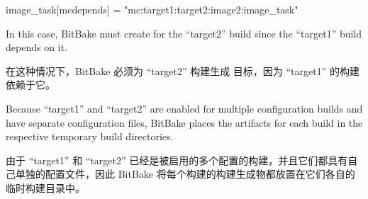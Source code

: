 \begin{pyglist}
image_task[mcdepends] = "mc:target1:target2:image2:image_task"
\end{pyglist}

In this case, BitBake must create  for the ``target2'' build since the ``target1'' build depends on it.

在这种情况下，BitBake 必须为 ``target2'' 构建生成  目标，因为 ``target1'' 的构建依赖于它。

Because ``target1'' and ``target2'' are enabled for multiple configuration builds and have separate configuration files, BitBake places the artifacts for each build in the respective temporary build directories.

由于 ``target1'' 和 ``target2'' 已经是被启用的多个配置的构建，并且它们都具有自己单独的配置文件，因此 BitBake 将每个构建的构建生成物都放置在它们各自的临时构建目录中。
